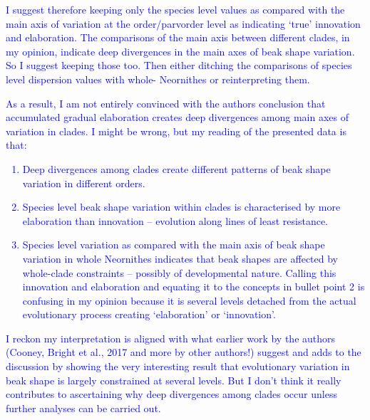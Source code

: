 \documentclass[12pt,letterpaper]{article}
\begin{document}
\textcolor{blue}{I suggest therefore keeping only the species level values as compared with the main axis of variation at the order/parvorder level as indicating ‘true’ innovation and elaboration. The comparisons of the main axis between different clades, in my opinion, indicate deep divergences in the main axes of beak shape variation. So I suggest keeping those too. Then either ditching the comparisons of species level dispersion values with whole- Neornithes or reinterpreting them.}

\textcolor{blue}{As a result, I am not entirely convinced with the authors conclusion that accumulated gradual elaboration creates deep divergences among main axes of variation in clades. I might be wrong, but my reading of the presented data is that:
\begin{enumerate}
\item Deep divergences among clades create different patterns of beak shape variation in different orders.
\item Species level beak shape variation within clades is characterised by more elaboration than innovation – evolution along lines of least resistance.
\item Species level variation as compared with the main axis of beak shape variation in whole Neornithes indicates that beak shapes are affected by whole-clade constraints – possibly of developmental nature. Calling this innovation and elaboration and equating it to the concepts in bullet point 2 is confusing in my opinion because it is several levels detached from the actual evolutionary process creating ‘elaboration’ or ‘innovation’.
\end{enumerate}
I reckon my interpretation is aligned with what earlier work by the authors (Cooney, Bright et al., 2017 and more by other authors!) suggest and adds to the discussion by showing the very interesting result that evolutionary variation in beak shape is largely constrained at several levels. But I don’t think it really contributes to ascertaining why deep divergences among clades occur unless further analyses can be carried out.}
\end{document}
